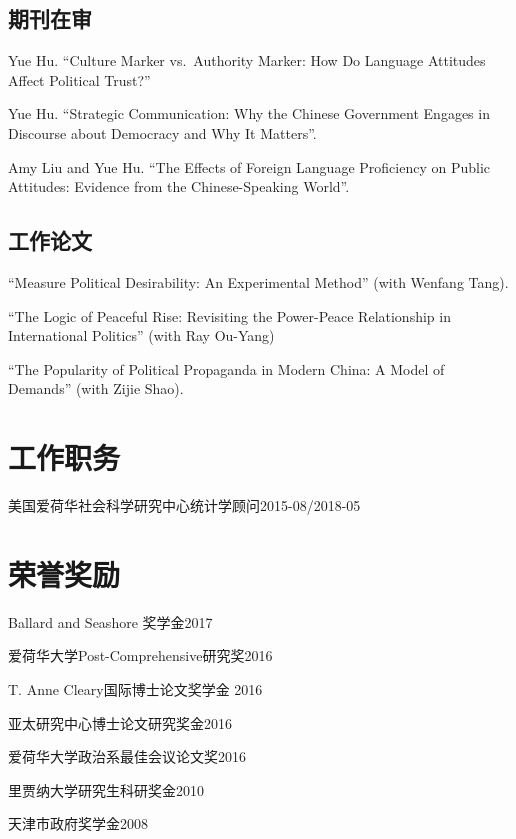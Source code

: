 \documentclass[10.5pt,]{article}
\providecommand{\tightlist}{%
	\setlength{\itemsep}{0pt}\setlength{\parskip}{0pt}}
\renewenvironment{itemize}{
	\begin{list}{}{
			\setlength{\leftmargin}{1.5em}
		}
	}{
	\end{list}
}
\begin{document}
\subsection{期刊在审}

Yue Hu. ``Culture Marker vs.~Authority Marker: How Do Language Attitudes
Affect Political Trust?''

Yue Hu. ``Strategic Communication: Why the Chinese Government Engages in
Discourse about Democracy and Why It Matters''.

Amy Liu and Yue Hu. ``The Effects of Foreign Language Proficiency on
Public Attitudes: Evidence from the Chinese-Speaking World''.

\subsection{工作论文}

``Measure Political Desirability: An Experimental Method'' (with Wenfang
Tang).

``The Logic of Peaceful Rise: Revisiting the Power-Peace Relationship in
International Politics'' (with Ray Ou-Yang)

``The Popularity of Political Propaganda in Modern China: A Model of
Demands'' (with Zijie Shao).

\section{工作职务}

\begin{itemize}
\tightlist
\item
  美国爱荷华社会科学研究中心统计学顾问\hfill 2015-08/2018-05
\end{itemize}

\section{荣誉奖励}

\begin{itemize}
\tightlist
\item
  Ballard and Seashore 奖学金\hfill 2017
\item
  爱荷华大学Post-Comprehensive研究奖\hfill 2016
\item
  T. Anne Cleary国际博士论文奖学金 \hfill 2016
\item
  亚太研究中心博士论文研究奖金\hfill 2016
\item
  爱荷华大学政治系最佳会议论文奖\hfill 2016
\item
  里贾纳大学研究生科研奖金\hfill 2010
\item
  天津市政府奖学金\hfill 2008
\end{itemize}
\end{document}
